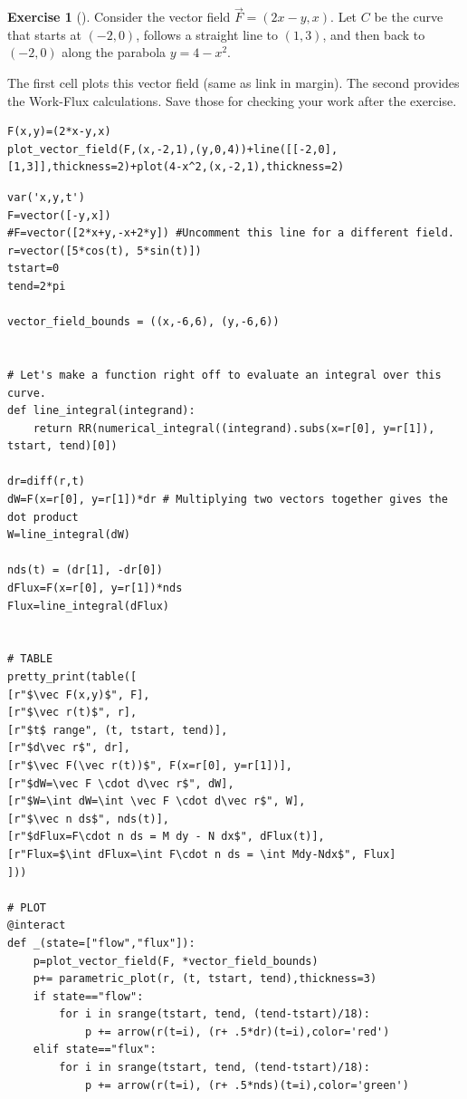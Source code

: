 \documentclass[10pt,]{book}
\theoremstyle{plain}
\theoremstyle{definition}
\theoremstyle{definition}
\theoremstyle{definition}
\theoremstyle{definition}
\newtheorem{exploration}[project]{Exercise}
\theoremstyle{definition}
\numberwithin{equation}{section}
\begin{document}
\begin{exploration}[]\label{exploration-201}
Consider the vector field \(\vec F=(2x-y,x)\). Let \(C\) be the curve that starts at \((-2,0)\), follows a straight line to \((1,3)\), and then back to \((-2,0)\) along the parabola \(y=4-x^2\).%
\par
The first cell plots this vector field (same as link in margin). The second provides the Work-Flux calculations. Save those for checking your work after the exercise.%
\begin{lstlisting}[style=sageinput]
F(x,y)=(2*x-y,x)
plot_vector_field(F,(x,-2,1),(y,0,4))+line([[-2,0],[1,3]],thickness=2)+plot(4-x^2,(x,-2,1),thickness=2)
\end{lstlisting}
\begin{lstlisting}[style=sageinput]
var('x,y,t')
F=vector([-y,x])
#F=vector([2*x+y,-x+2*y]) #Uncomment this line for a different field.
r=vector([5*cos(t), 5*sin(t)])
tstart=0
tend=2*pi

vector_field_bounds = ((x,-6,6), (y,-6,6))


# Let's make a function right off to evaluate an integral over this curve.
def line_integral(integrand):
    return RR(numerical_integral((integrand).subs(x=r[0], y=r[1]), tstart, tend)[0])

dr=diff(r,t)
dW=F(x=r[0], y=r[1])*dr # Multiplying two vectors together gives the dot product
W=line_integral(dW)

nds(t) = (dr[1], -dr[0])
dFlux=F(x=r[0], y=r[1])*nds
Flux=line_integral(dFlux)


# TABLE
pretty_print(table([
[r"$\vec F(x,y)$", F],
[r"$\vec r(t)$", r],
[r"$t$ range", (t, tstart, tend)],
[r"$d\vec r$", dr],
[r"$\vec F(\vec r(t))$", F(x=r[0], y=r[1])],
[r"$dW=\vec F \cdot d\vec r$", dW],
[r"$W=\int dW=\int \vec F \cdot d\vec r$", W],
[r"$\vec n ds$", nds(t)],
[r"$dFlux=F\cdot n ds = M dy - N dx$", dFlux(t)],
[r"Flux=$\int dFlux=\int F\cdot n ds = \int Mdy-Ndx$", Flux]
]))

# PLOT
@interact
def _(state=["flow","flux"]):
    p=plot_vector_field(F, *vector_field_bounds)
    p+= parametric_plot(r, (t, tstart, tend),thickness=3)
    if state=="flow":
        for i in srange(tstart, tend, (tend-tstart)/18):
            p += arrow(r(t=i), (r+ .5*dr)(t=i),color='red')
    elif state=="flux":
        for i in srange(tstart, tend, (tend-tstart)/18):
            p += arrow(r(t=i), (r+ .5*nds)(t=i),color='green')
    

\end{lstlisting}
\end{exploration}
\end{document}
